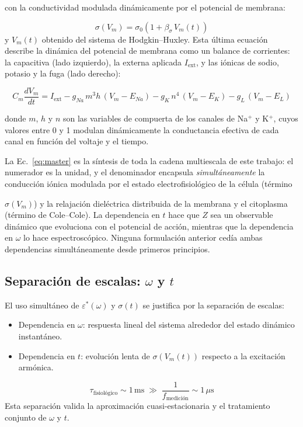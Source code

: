 \documentclass[12pt]{article}
\begin{document}
con la conductividad modulada din\'amicamente por el potencial de membrana:

\begin{equation}
\sigma(V_m) = \sigma_0 \left(1 + \beta_\sigma\, V_m(t)\right)
\label{eq:sigma_vm}
\end{equation}
y $V_m(t)$ obtenido del sistema de Hodgkin--Huxley. Esta \'ultima ecuaci\'on
describe la din\'amica del potencial de membrana como un balance de corrientes:
la capacitiva (lado izquierdo), la externa aplicada $I_{\text{ext}}$, y las
i\'onicas de sodio, potasio y la fuga (lado derecho):

\begin{equation}
C_m \frac{dV_m}{dt} = I_{\text{ext}} - g_{Na}\,m^3 h\,(V_m - E_{Na})
- g_K\,n^4\,(V_m - E_K) - g_L\,(V_m - E_L)
\end{equation}

donde $m$, $h$ y $n$ son las variables de compuerta de los canales de Na$^+$ y K$^+$,
cuyos valores entre 0 y 1 modulan din\'amicamente la conductancia efectiva
de cada canal en funci\'on del voltaje y el tiempo.

\noindent La Ec.~\eqref{eq:master} es la s\'intesis de toda la cadena multiescala de este
trabajo: el numerador es la unidad, y el denominador encapsula \emph{simult\'aneamente} la
conducci\'on i\'onica modulada por el estado electrofisiol\'ogico de la c\'elula (t\'ermino

$\sigma(V_m)$) y la relajaci\'on diel\'ectrica distribuida de la membrana y el citoplasma (t\'ermino
de Cole--Cole). La dependencia en $t$ hace que $Z$ sea un observable din\'amico que evoluciona
con el potencial de acci\'on, mientras que la dependencia en $\omega$ lo hace
espectrosc\'opico. Ninguna formulaci\'on anterior ced\'{i}a ambas dependencias
simult\'aneamente
desde primeros principios.

\subsection{Separaci\'on de escalas: $\omega$ y $t$}
\label{sec:separacion_escalas}

El uso simult\'aneo de $\varepsilon^*(\omega)$ y
$\sigma(t)$ se justifica por la separaci\'on de escalas:
\begin{itemize}
\item Dependencia en $\omega$: respuesta lineal del
sistema alrededor del estado din\'amico instant\'aneo.
\item Dependencia en $t$: evoluci\'on lenta de
$\sigma(V_m(t))$ respecto a la excitaci\'on arm\'onica.
\end{itemize}
\begin{equation}
\tau_\text{fisiol\'ogico} \sim 1\,\text{ms}
\;\gg\;
\frac{1}{f_\text{medici\'on}} \sim 1\,\mu\text{s}
\end{equation}
Esta separaci\'on valida la aproximaci\'on cuasi-estacionaria
y el tratamiento conjunto de $\omega$ y $t$.
\end{document}
